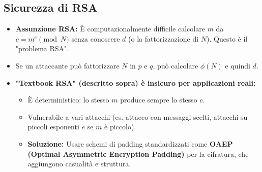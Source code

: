 \documentclass{article}
\begin{document}
\subsection{Sicurezza di RSA}
\begin{itemize}
    \item \textbf{Assunzione RSA:} È computazionalmente difficile calcolare $m$ da $c = m^e \pmod{N}$ senza conoscere $d$ (o la fattorizzazione di $N$). Questo è il "problema RSA".
    \item Se un attaccante può fattorizzare $N$ in $p$ e $q$, può calcolare $\phi(N)$ e quindi $d$.
    \item \textbf{"Textbook RSA" (descritto sopra) è insicuro per applicazioni reali:}
    \begin{itemize}
        \item È deterministico: lo stesso $m$ produce sempre lo stesso $c$.
        \item Vulnerabile a vari attacchi (es. attacco con messaggi scelti, attacchi su piccoli esponenti $e$ se $m$ è piccolo).
        \item \textbf{Soluzione:} Usare schemi di padding standardizzati come \textbf{OAEP (Optimal Asymmetric Encryption Padding)} per la cifratura, che aggiungono casualità e struttura.
    \end{itemize}
\end{itemize}
\end{document}

